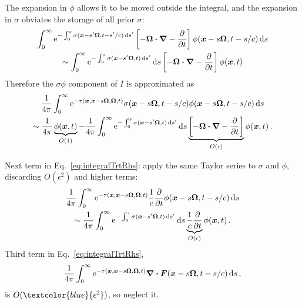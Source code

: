 \documentclass{beamer}
\newcommand{\epsiloncolor}[1]{\textcolor{blue}{#1}}
\begin{document}
\begin{frame}
 The expansion in $\phi$ allows it to be moved outside the integral, and the
 expansion in $\sigma$ obviates the storage of all prior $\sigma$:
\begin{multline*}
  \int_{0}^{\infty} \mathop{}\!\mathrm{e}^{- \int_{0}^{s} \sigma(\bm{x}-s'\bm{\Omega}, t-s'/c) \mathop{}\!\mathrm{d} s'}
\left[ -\bm{\Omega} \bm{\cdot} \bm{\nabla} - \frac{\partial }{\partial t} \right] \phi(\bm{x} - s \bm{\Omega}, t-s/c)
\mathop{}\!\mathrm{d} s
\\
\sim \int_{0}^{\infty} \mathop{}\!\mathrm{e}^{- \int_{0}^{s} \sigma(\bm{x}-s'\bm{\Omega}, t)
\mathop{}\!\mathrm{d} s'} \mathop{}\!\mathrm{d} s
\left[ -\bm{\Omega} \bm{\cdot} \bm{\nabla} - \frac{\partial }{\partial t} \right] \phi(\bm{x}, t)
\end{multline*}
Therefore the $\sigma\phi$ component of $I$ is approximated as
\begin{multline*}
  \frac{1}{4\pi}\int_{0}^{\infty} \mathop{}\!\mathrm{e}^{ -\tau(\bm{x}, \bm{x} - s
  \bm{\Omega}, \bm{\Omega}, t)} \sigma(\bm{x} - s \bm{\Omega}, t-s/c)
  \phi(\bm{x} - s \bm{\Omega}, t-s/c) \mathop{}\!\mathrm{d} s
  \\
  \sim 
  \frac{1}{4\pi}\underbrace{\phi(\bm{x}, t)}_{O(1)}
  - \frac{1}{4\pi}\int_{0}^{\infty} \mathop{}\!\mathrm{e}^{- \int_{0}^{s} \sigma(\bm{x}-s'\bm{\Omega}, t)
\mathop{}\!\mathrm{d} s'} \mathop{}\!\mathrm{d} s
\underbrace{\left[ -\bm{\Omega} \bm{\cdot} \bm{\nabla} - \frac{\partial }{\partial t} \right]}_{O(\epsilon)} \phi(\bm{x}, t)\,.
\end{multline*}
\end{frame}
\begin{frame}
  Next term in Eq.~\eqref{eq:integralTrtRhs}: apply the same Taylor series to
  $\sigma$ and $\phi$, discarding $O(\epsilon^2)$ and higher terms:
\begin{multline*}
  \frac{1}{4\pi}\int_{0}^{\infty} \mathop{}\!\mathrm{e}^{ -\tau(\bm{x}, \bm{x} - s
  \bm{\Omega}, \bm{\Omega}, t)}
  \frac{1}{c} \frac{\partial }{\partial t}\phi(\bm{x} - s \bm{\Omega}, t-s/c) \mathop{}\!\mathrm{d} s
 \\
 \sim 
  \frac{1}{4\pi}\int_{0}^{\infty} \mathop{}\!\mathrm{e}^{- \int_{0}^{s} \sigma(\bm{x}-s'\bm{\Omega}, t)
  \mathop{}\!\mathrm{d} s'} \mathop{}\!\mathrm{d} s
  \underbrace{\frac{1}{c} \frac{\partial }{\partial t}}_{O(\epsilon)}\phi(\bm{x}, t)\,.
\end{multline*}
Third term in Eq.~\eqref{eq:integralTrtRhs},
  \begin{equation*}
    \frac{1}{4\pi}\int_{0}^{\infty} \mathop{}\!\mathrm{e}^{ -\tau(\bm{x}, \bm{x} - s
    \bm{\Omega}, \bm{\Omega}, t)}
    \bm{\nabla} \bm{\cdot} \bm{F}(\bm{x} - s \bm{\Omega}, t-s/c) \mathop{}\!\mathrm{d} s\,,
  \end{equation*}
is $O(\epsiloncolor{\epsilon^2})$, so neglect it.
\end{frame}
\end{document}
